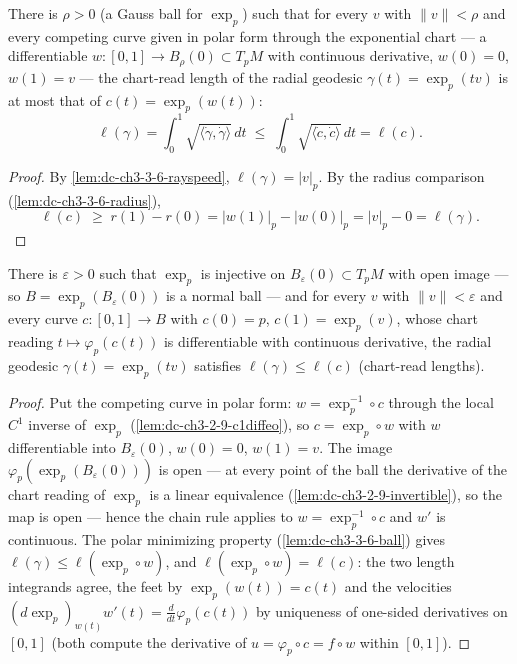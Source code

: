 \begin{lemma}
  \label{lem:dc-ch3-3-6-ball}
  \leanok
  There is $\rho>0$ (a Gauss ball for $\exp_p$) such that for every $v$ with
  $\|v\|<\rho$ and every competing curve given in polar form through the
  exponential chart — a differentiable $w:[0,1]\to B_\rho(0)\subset T_pM$ with
  continuous derivative, $w(0)=0$, $w(1)=v$ — the chart-read length of the
  radial geodesic $\gamma(t)=\exp_p(tv)$ is at most that of
  $c(t)=\exp_p(w(t))$:
  $$\ell(\gamma)=\int_0^1\sqrt{\langle\dot\gamma,\dot\gamma\rangle}\,dt
    \;\le\;\int_0^1\sqrt{\langle\dot c,\dot c\rangle}\,dt=\ell(c).$$
\end{lemma}
\begin{proof}
  \sketch
  \leanok
  By \cref{lem:dc-ch3-3-6-rayspeed}, $\ell(\gamma)=|v|_p$. By the radius
  comparison (\cref{lem:dc-ch3-3-6-radius}),
  $$\ell(c)\;\ge\;r(1)-r(0)=|w(1)|_p-|w(0)|_p=|v|_p-0=\ell(\gamma).
  $$
\end{proof}

\begin{lemma}
  \label{lem:dc-ch3-3-6-normal}
  \leanok
  There is $\varepsilon>0$ such that $\exp_p$ is injective on
  $B_\varepsilon(0)\subset T_pM$ with open image — so
  $B=\exp_p(B_\varepsilon(0))$ is a normal ball — and for every $v$ with
  $\|v\|<\varepsilon$ and every curve $c:[0,1]\to B$ with $c(0)=p$,
  $c(1)=\exp_p(v)$, whose chart reading $t\mapsto\varphi_p(c(t))$ is
  differentiable with continuous derivative, the radial geodesic
  $\gamma(t)=\exp_p(tv)$ satisfies $\ell(\gamma)\le\ell(c)$ (chart-read
  lengths).
\end{lemma}
\begin{proof}
  \sketch
  \leanok
  Put the competing curve in polar form: $w=\exp_p^{-1}\circ c$ through the
  local $C^1$ inverse of $\exp_p$ (\cref{lem:dc-ch3-2-9-c1diffeo}), so
  $c=\exp_p\circ w$ with $w$ differentiable into $B_\varepsilon(0)$,
  $w(0)=0$, $w(1)=v$. The image $\varphi_p(\exp_p(B_\varepsilon(0)))$ is open
  — at every point of the ball the derivative of the chart reading of
  $\exp_p$ is a linear equivalence (\cref{lem:dc-ch3-2-9-invertible}), so the
  map is open — hence the chain rule applies to $w=\exp_p^{-1}\circ c$ and
  $w'$ is continuous. The polar minimizing property
  (\cref{lem:dc-ch3-3-6-ball}) gives $\ell(\gamma)\le\ell(\exp_p\circ w)$,
  and $\ell(\exp_p\circ w)=\ell(c)$: the two length integrands agree, the
  feet by $\exp_p(w(t))=c(t)$ and the velocities
  $(d\exp_p)_{w(t)}w'(t)=\frac{d}{dt}\varphi_p(c(t))$ by uniqueness of
  one-sided derivatives on $[0,1]$ (both compute the derivative of
  $u=\varphi_p\circ c=f\circ w$ within $[0,1]$).
\end{proof}

